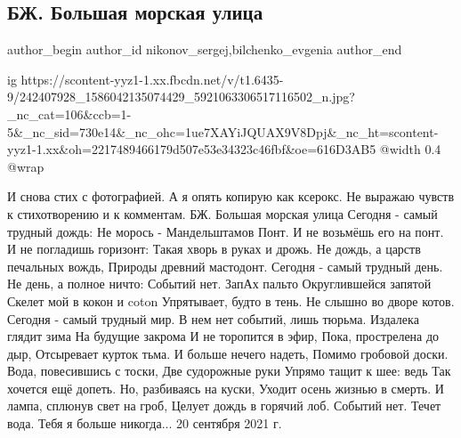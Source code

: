  
 
 
 
 
 
\subsection{БЖ. Большая морская улица}
\label{sec:21_09_2021.fb.nikonov_sergej.3.bilchenko_bolshaja_morskaja_ulica}
 
\ifcmt
 author_begin
   author_id nikonov_sergej,bilchenko_evgenia
 author_end
\fi

\ifcmt
  ig https://scontent-yyz1-1.xx.fbcdn.net/v/t1.6435-9/242407928_1586042135074429_5921063306517116502_n.jpg?_nc_cat=106&ccb=1-5&_nc_sid=730e14&_nc_ohc=1ue7XAYiJQUAX9V8Dpj&_nc_ht=scontent-yyz1-1.xx&oh=2217489466179d507e53e34323c46fbf&oe=616D3AB5
  @width 0.4
  @wrap 
\fi

И снова стих с фотографией. А я опять копирую как ксерокс. Не выражаю чувств к стихотворению и к комментам.
БЖ. Большая морская улица
Сегодня - самый трудный дождь:
Не морось - Мандельштамов Понт.
И не возьмёшь его на понт.
И не погладишь горизонт:
Такая хворь в руках и дрожь.
Не дождь, а царств печальных вождь,
Природы древний мастодонт.
Сегодня - самый трудный день.
Не день, а полное ничто:
Событий нет. ЗапАх пальто
Округлившейся запятой
Скелет мой в кокон и coton
Упрятывает, будто в тень.
Не слышно во дворе котов.
Сегодня - самый трудный мир.
В нем нет событий, лишь тюрьма.
Издалека глядит зима
На будущие закрома
И не торопится в эфир,
Пока, прострелена до дыр,
Отсыревает курток тьма.
И больше нечего надеть,
Помимо гробовой доски.
Вода, повесившись с тоски,
Две судорожные руки
Упрямо тащит к шее: ведь
Так хочется ещё допеть.
Но, разбиваясь на куски,
Уходит осень жизнью в смерть.
И лампа, сплюнув свет на гроб,
Целует дождь в горячий лоб.
Событий нет.
Течет вода.
Тебя я больше никогда...
20 сентября 2021 г.

